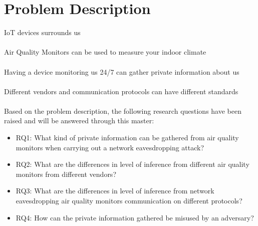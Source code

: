 \chapter*{Problem Description}
IoT devices surrounds us\\
\\
Air Quality Monitors can be used to measure your indoor climate\\
\\
Having a device monitoring us 24/7 can gather private information about us\\
\\
Different vendors and communication protocols can have different standards\\
\\
Based on the problem description, the following research questions have been raised and will be answered through this master:
\begin{itemize}
    \item 
    RQ1: What kind of private information can be gathered from air quality monitors when carrying out a network eavesdropping attack?
    \item 
    RQ2: What are the differences in level of inference from different air quality monitors from different vendors?
    \item
    RQ3: What are the differences in level of inference from network eavesdropping air quality monitors communication on different protocols?
    \item 
    RQ4: How can the private information gathered be misused by an adversary?
\end{itemize}